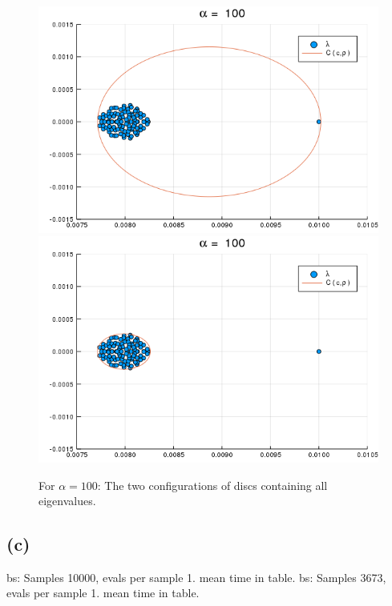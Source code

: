 \begin{figure}[h!]
\centering
\includegraphics[scale=0.4]{../task2/images/Task2_b_a100_1.png}
\includegraphics[scale=0.4]{../task2/images/Task2_b_a100_2.png}
\caption{For $\alpha = 100$: The two configurations of discs containing all eigenvalues.}
\label{fig:task2b_100}
\end{figure}

\subsection*{(c)}
bs: Samples 10000, evals per sample 1. mean time in table.
bs: Samples 3673, evals per sample 1. mean time in table.

